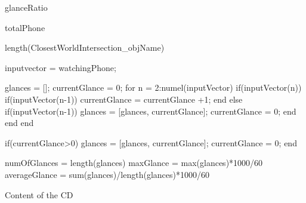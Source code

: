 glanceRatio

totalPhone

length(ClosestWorldIntersection_objName)

inputvector = watchingPhone;

glances = [];
currentGlance = 0;
for n = 2:numel(inputVector)
    if(inputVector(n))
        if(inputVector(n-1))
            currentGlance = currentGlance +1;
        end
    else
        if(inputVector(n-1))
            glances = [glances, currentGlance];
            currentGlance = 0;
        end
    end
end


if(currentGlance>0)
    glances = [glances, currentGlance];
    currentGlance = 0;
end

numOfGlances = length(glances)
maxGlance = max(glances)*1000/60
averageGlance = sum(glances)/length(glances)*1000/60
\endtt

\nextoddpage

\app Content of the CD

